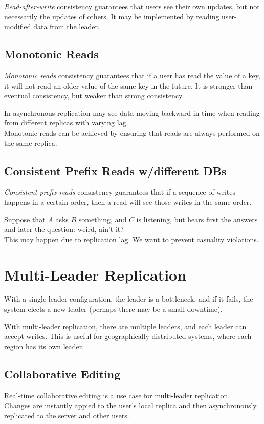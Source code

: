 \textit{Read-after-write} consistency guarantees that \ul{users see their own updates, but not necessarily the updates of others.}
It may be implemented by reading user-modified data from the leader.

\subsection{Monotonic Reads}
\textit{Monotonic reads} consistency guarantees that if a user has read the value of a key, it will not read an older value of the same key in the future.
It is stronger than eventual consistency, but weaker than strong consistency.

In asynchronous replication may see data moving backward in time when reading from different replicas with varying lag.\\
Monotonic reads can be achieved by ensuring that reads are always performed on the same replica.

\subsection{Consistent Prefix Reads w/different DBs}
\textit{Consistent prefix reads} consistency guarantees that if a sequence of writes happens in a certain order, then a read will see those writes in the same order.

Suppose that $A$ asks $B$ something, and $C$ is listening, but hears first the answers and later the question: weird, ain't it?\\
This may happen due to replication lag. We want to prevent casuality violations.


\section{Multi-Leader Replication}
With a single-leader configuration, the leader is a bottleneck, and if it fails, the system elects a new leader (perhaps there may be a small downtime).

With multi-leader replication, there are multiple leaders, and each leader can accept writes. This is useful for geographically distributed systems, where each region has its own leader.

\subsection{Collaborative Editing}
Real-time collaborative editing is a use case for multi-leader replication.\\
Changes are instantly appied to the user's local replica and then asynchronously replicated to the server and other users.

